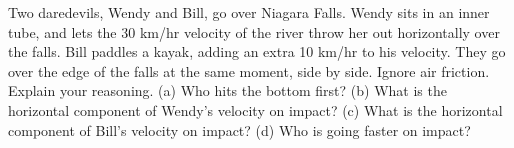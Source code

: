 Two daredevils, Wendy and Bill, go over Niagara Falls.
Wendy sits in an inner tube, and lets the 30 km/hr velocity
of the river throw her out horizontally over the falls. Bill
paddles a kayak, adding an extra 10 km/hr to his velocity.
They go over the edge of the falls at the same moment, side
by side. Ignore air friction. Explain your reasoning.\hwendpart
(a) Who hits the bottom first?\hwendpart
(b) What is the horizontal component of Wendy's velocity on impact?\hwendpart
(c) What is the horizontal component of Bill's velocity on impact?\hwendpart
(d) Who is going faster on impact?
